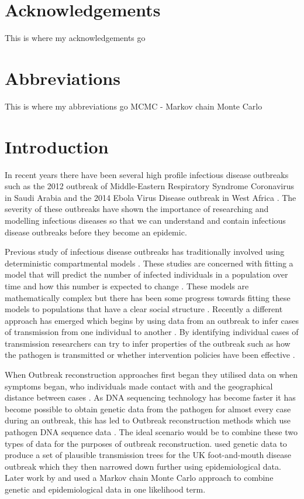 \documentclass[11pt,a4paper]{report}
\begin{document}
\newpage

\chapter*{Acknowledgements}
\thispagestyle{empty}
This is where my acknowledgements go
\newpage

\tableofcontents
\pagestyle{plain}
\newpage

\chapter*{Abbreviations}
\thispagestyle{empty}
This is where my abbreviations go
MCMC - Markov chain Monte Carlo
\newpage


\chapter{Introduction}
In recent years there have been several high profile infectious disease outbreaks such as the 2012 outbreak of Middle-Eastern Respiratory Syndrome Coronavirus in Saudi Arabia \citep{MERS} and the 2014 Ebola Virus Disease outbreak in West Africa \citep{Ebola14}. The severity of these outbreaks have shown the importance of researching and modelling infectious diseases so that we can understand and contain infectious disease outbreaks before they become an epidemic.

Previous study of infectious disease outbreaks has traditionally involved using deterministic compartmental models \citep{Anderson92}. These studies are concerned with fitting a model that will predict the number of infected individuals in a population over time and how this number is expected to change \citep{Breban07}. These models are mathematically complex but there has been some progress towards fitting these models to populations that have a clear social structure \citep{Ball01}. Recently a different approach has emerged which begins by using data from an outbreak to infer cases of transmission from one individual to another \citep{Teunis13,outbrkr}. By identifying individual cases of transmission researchers can try to infer properties of the outbreak such as how the pathogen is transmitted \citep{Ypmawind} or whether intervention policies have been effective \citep{Ferguson01}.

When Outbreak reconstruction approaches first began they utilised data on when symptoms began, who individuals made contact with and the geographical distance between cases \citep{Haydon03,Ferguson01}. As DNA sequencing technology has become faster \citep{Koser12} it has become possible to obtain genetic data from the pathogen for almost every case during an outbreak, this has led to Outbreak reconstruction methods which use pathogen DNA sequence data \citep{Snitkin12}. The ideal scenario would be to combine these two types of data for the purposes of outbreak reconstruction. \citet{Cottam08} used genetic data to produce a set of plausible transmission trees for the UK foot-and-mouth disease outbreak which they then narrowed down further using epidemiological data. Later work by \citet{Ypma12} and \citet{Morelli12} used a Markov chain Monte Carlo approach to combine genetic and epidemiological data in one likelihood term.
\end{document}
